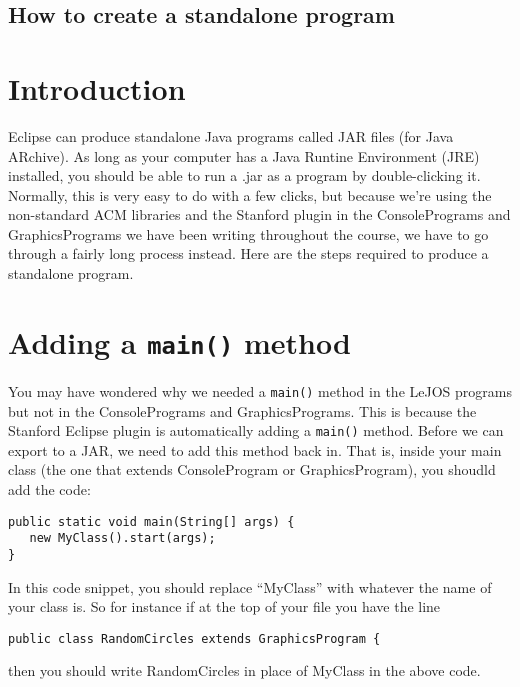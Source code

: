 \documentclass[11pt]{article}
\theoremstyle{plain}
\theoremstyle{definition}
\theoremstyle{remark}
\begin{document}
\begin{center}
\section*{How to create a standalone program}
\end{center}
\section*{Introduction}
Eclipse can produce standalone Java programs called JAR files (for Java
ARchive). As long as your computer has a Java Runtine Environment (JRE)
installed, you should be able to run a .jar as a program by double-clicking it.
Normally, this is very easy to do with a few clicks, but because we're using the
non-standard ACM libraries and the Stanford plugin in the ConsolePrograms and
GraphicsPrograms we have been writing throughout the course, we have to go
through a fairly long process instead. Here are the steps required to produce a
standalone program.
\section{Adding a {\tt main()} method}
You may have wondered why we needed a {\tt main()} method in the LeJOS programs
but not in the ConsolePrograms and GraphicsPrograms. This is because the
Stanford Eclipse plugin is automatically adding a {\tt main()} method. Before we
can export to a JAR, we need to add this method back in. That is, inside your
main class (the one that extends ConsoleProgram or GraphicsProgram), you shoudld
add the code:
\begin{lstlisting}
public static void main(String[] args) {
   new MyClass().start(args);
}
\end{lstlisting}
In this code snippet, you should replace ``MyClass'' with whatever the name of
your class is. So for instance if at the top of your file you have the line
\begin{lstlisting}
public class RandomCircles extends GraphicsProgram {
\end{lstlisting}
then you should write RandomCircles in place of MyClass in the above code. 
\end{document}
